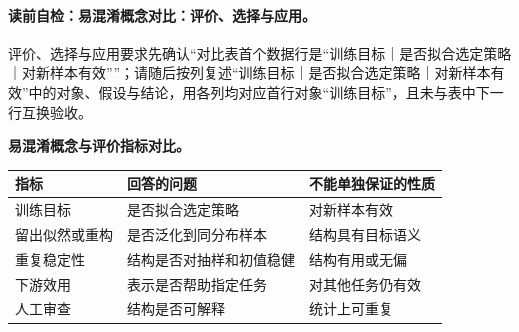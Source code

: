 \label{struct:V4-C01-CH31}
\paragraph{读前自检：易混淆概念对比：评价、选择与应用。}评价、选择与应用要求先确认“对比表首个数据行是“训练目标｜是否拟合选定策略｜对新样本有效””；请随后按列复述“训练目标｜是否拟合选定策略｜对新样本有效”中的对象、假设与结论，用各列均对应首行对象“训练目标”，且未与表中下一行互换验收。\par

\begin{comparisonbox}
\textbf{易混淆概念与评价指标对比。}\par\smallskip
\begin{tabularx}{\linewidth}{@{}l X X@{}}
\toprule 指标 & 回答的问题 & 不能单独保证的性质\\ \midrule
训练目标 & 是否拟合选定策略 & 对新样本有效\\
留出似然或重构 & 是否泛化到同分布样本 & 结构具有目标语义\\
重复稳定性 & 结构是否对抽样和初值稳健 & 结构有用或无偏\\
下游效用 & 表示是否帮助指定任务 & 对其他任务仍有效\\
人工审查 & 结构是否可解释 & 统计上可重复\\
\bottomrule
\end{tabularx}
\end{comparisonbox}


